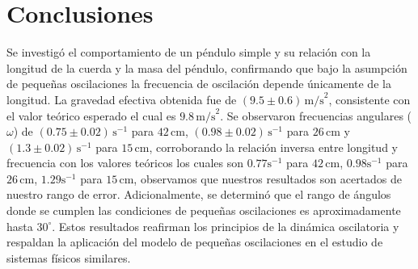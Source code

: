 \documentclass[12pt,a4]{article}
\begin{document}
\section{Conclusiones}

Se investigó el comportamiento de un péndulo simple y su relación con la longitud de la cuerda y la masa del péndulo, confirmando que bajo la asumpción de pequeñas oscilaciones la frecuencia de oscilación depende únicamente de la longitud. La gravedad efectiva obtenida fue de \((9.5 \pm 0.6) \, \text{m/s}^2\), consistente con el valor teórico esperado el cual es \(9.8 \, \text{m/s}^2\). Se observaron frecuencias angulares (\(\omega\)) de \((0.75 \pm 0.02)\, \text{s}^{-1}\) para \(42 \, \text{cm}\), \((0.98 \pm 0.02) \, \text{s}^{-1}\) para \(26 \, \text{cm}\) y \((1.3 \pm 0.02) \, \text{s}^{-1}\) para \(15 \, \text{cm}\), corroborando la relación inversa entre longitud y frecuencia con los valores teóricos los cuales son \(0.77 \text{s}^{-1}\) para \(42 \, \text{cm}\), \(0.98 \text{s}^{-1}\) para \(26 \, \text{cm}\), \(1.29 \text{s}^{-1}\) para \(15 \, \text{cm}\), observamos que nuestros resultados son acertados de nuestro rango de error. Adicionalmente, se determinó que el rango de ángulos donde se cumplen las condiciones de pequeñas oscilaciones es aproximadamente hasta $30^\circ$. Estos resultados reafirman los principios de la dinámica oscilatoria y respaldan la aplicación del modelo de pequeñas oscilaciones en el estudio de sistemas físicos similares.
\end{document}
